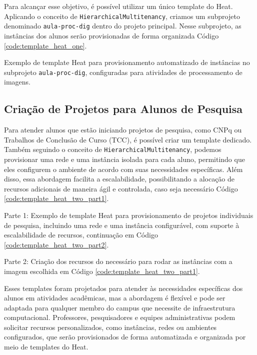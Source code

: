 Para alcançar esse objetivo, é possível utilizar um único template do Heat. Aplicando o conceito de \texttt{HierarchicalMultitenancy}, criamos um subprojeto denominado \texttt{aula-proc-dig} dentro do projeto principal. Nesse subprojeto, as instâncias dos alunos serão provisionadas de forma organizada Código \ref{code:template_heat_one}.

\begin{listing}[h!]
    \noindent{}  
  \caption{Exemplo de template Heat para provisionamento automatizado de instâncias no subprojeto \texttt{aula-proc-dig}, configuradas para atividades de processamento de imagens.}
  \label{code:template_heat_one}
\end{listing}

\newpage

\subsection{Criação de Projetos para Alunos de Pesquisa}

Para atender alunos que estão iniciando projetos de pesquisa, como CNPq ou Trabalhos de Conclusão de Curso (TCC), é possível criar um template dedicado. Também seguindo o conceito de \texttt{HierarchicalMultitenancy}, podemos provisionar uma rede e uma instância isolada para cada aluno, permitindo que eles configurem o ambiente de acordo com suas necessidades específicas. Além disso, essa abordagem facilita a escalabilidade, possibilitando a alocação de recursos adicionais de maneira ágil e controlada, caso seja necessário Código \ref{code:template_heat_two_part1}.

\begin{listing}[h!]
    \noindent{}  
  \caption{Parte 1: Exemplo de template Heat para provisionamento de projetos individuais de pesquisa, incluindo uma rede e uma instância configurável, com suporte à escalabilidade de recursos, continuação em Código \ref{code:template_heat_two_part2}.}
  \label{code:template_heat_two_part1}
\end{listing}

\begin{listing}[h!]
  \noindent{}  
\caption{Parte 2: Criação dos recursos do necessário para rodar as instâncias com a imagem escolhida em Código \ref{code:template_heat_two_part1}.}
\label{code:template_heat_two_part2}
\end{listing}



Esses templates foram projetados para atender às necessidades específicas dos alunos em atividades acadêmicas, mas a abordagem é flexível e pode ser adaptada para qualquer membro do campus que necessite de infraestrutura computacional. Professores, pesquisadores e equipes administrativas podem solicitar recursos personalizados, como instâncias, redes ou ambientes configurados, que serão provisionados de forma automatizada e organizada por meio de templates do Heat.